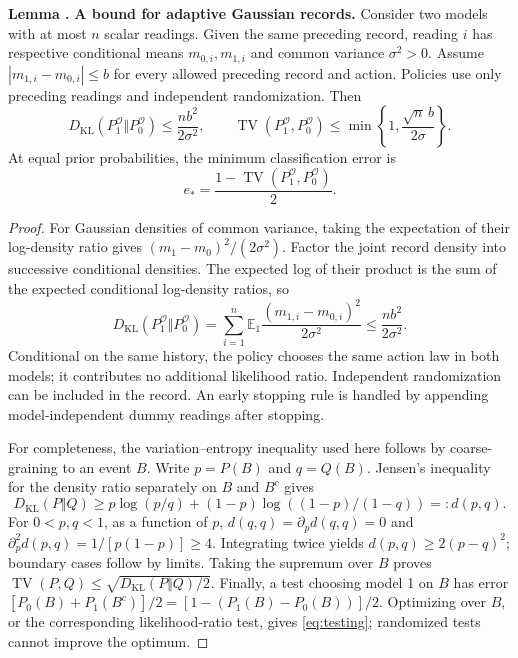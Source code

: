 \documentclass[10pt]{article}
\newcounter{claim}
\newcommand{\claim}[2]{\refstepcounter{claim}\label{#1}\textbf{#2 \theclaim.}}
\newcommand{\TV}{\operatorname{TV}}
\newcommand{\KL}{D_{\mathrm{KL}}}
\newcommand{\obs}{\mathcal O}
\begin{document}
\begin{resultbox}
\claim{lem:observation}{Lemma} \textbf{A bound for adaptive Gaussian records.}
Consider two models with at most $n$ scalar readings. Given the same preceding
record, reading $i$ has respective conditional means $m_{0,i},m_{1,i}$ and
common variance $\sigma^2>0$. Assume
$|m_{1,i}-m_{0,i}|\leq b$ for every allowed preceding record and action.
Policies use only preceding readings and independent randomization. Then
\begin{equation}
\KL(P_1^{\obs}\Vert P_0^{\obs})\leq\frac{nb^2}{2\sigma^2},
\qquad
\TV(P_1^{\obs},P_0^{\obs})\leq
\min\!\left\{1,\frac{\sqrt n\,b}{2\sigma}\right\}.
\label{eq:record-bound}
\end{equation}
At equal prior probabilities, the minimum classification error is
\begin{equation}
e_* = \frac{1-\TV(P_1^{\obs},P_0^{\obs})}{2}.
\label{eq:testing}
\end{equation}
\end{resultbox}
\begin{proof}
For Gaussian densities of common variance, taking the expectation of their
log-density ratio gives $(m_1-m_0)^2/(2\sigma^2)$. Factor the joint record
density into successive conditional densities. The expected log of their
product is the sum of the expected conditional log-density ratios, so
\[
\KL(P_1^{\obs}\Vert P_0^{\obs})
=\sum_{i=1}^n\mathbb E_1
 \frac{(m_{1,i}-m_{0,i})^2}{2\sigma^2}
\leq\frac{nb^2}{2\sigma^2}.
\]
Conditional on the same history, the policy chooses the same action law in
both models; it contributes no additional likelihood ratio. Independent
randomization can be included in the record. An early stopping rule is handled
by appending model-independent dummy readings after stopping.

For completeness, the variation--entropy inequality used here follows by
coarse-graining to an event $B$. Write $p=P(B)$ and $q=Q(B)$. Jensen's
inequality for the density ratio separately on $B$ and $B^c$ gives
\[
\KL(P\Vert Q)\geq
p\log(p/q)+(1-p)\log((1-p)/(1-q))=:d(p,q).
\]
For $0<p,q<1$, as a function of $p$, $d(q,q)=\partial_p d(q,q)=0$ and
$\partial_p^2d(p,q)=1/[p(1-p)]\geq4$. Integrating twice yields
$d(p,q)\geq2(p-q)^2$; boundary cases follow by limits. Taking the supremum
over $B$ proves $\TV(P,Q)\leq\sqrt{\KL(P\Vert Q)/2}$.
Finally, a test choosing model 1 on $B$ has error
$[P_0(B)+P_1(B^c)]/2=[1-(P_1(B)-P_0(B))]/2$.
Optimizing over $B$, or the corresponding likelihood-ratio test, gives
\eqref{eq:testing}; randomized tests cannot improve the optimum.
\end{proof}
\end{document}
